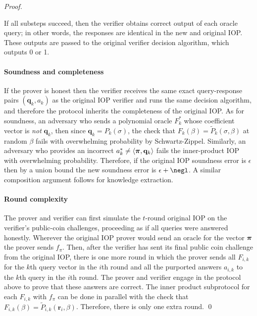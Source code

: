 \begin{proof}
\begin{itemize}
\end{itemize}

If all substeps succeed, then the verifier obtains correct output of each oracle query; in other words, the responses are identical in the new and original IOP. These outputs are passed to the original verifier decision algorithm, which outputs 0 or 1.

\paragraph{Soundness and completeness} If the prover is honest then the verifier receives the same exact query-response pairs $(\mathbf{q}_k, a_k)$ as the original IOP verifier and runs the same decision algorithm, and therefore the protocol inherits the completeness of the original IOP. As for soundness, an adversary who sends a polynomial oracle $F_k^*$ whose coefficient vector is \emph{not} $\mathbf{q}_k$, then since $\mathbf{q}_k = P_k(\sigma)$, the check that $F_k (\beta) = \tilde{P}_k(\sigma, \beta)$ at random $\beta$ fails with overwhelming probability by Schwartz-Zippel. Similarly, an adversary who provides an incorrect $a_k^* \neq \langle \boldsymbol{\pi}, \mathbf{q}_k \rangle$ fails the inner-product IOP with overwhelming probability.
Therefore, if the original IOP soundness error is $\epsilon$ then by a union bound the new soundness error is $\epsilon + \negl$. A similar composition argument follows for knowledge extraction.%

\paragraph{Round complexity} The prover and verifier can first simulate the $t$-round original IOP  on the verifier's public-coin challenges, proceeding as if all queries were answered honestly. Wherever the original IOP prover would send an oracle for the vector $\boldsymbol{\pi}$ the prover sends $f_\pi$. Then, after the verifier has sent its final public coin challenge from the original IOP, there is one more round in which the prover sends all $F_{i, k}$ for the $k$th query vector in the $i$th round and all the purported answers $a_{i, k}$ to the $k$th query in the $i$th round. The prover and verifier engage in the protocol above to prove that these answers are correct. The inner product subprotocol for each $F_{i,k}$ with $f_\pi$ can be done in parallel with the check that $F_{i,k}(\beta) = \tilde{P}_{i,k}(\mathbf{r}_i, \beta)$. Therefore, there is only one extra round. \qed   
\end{proof}


